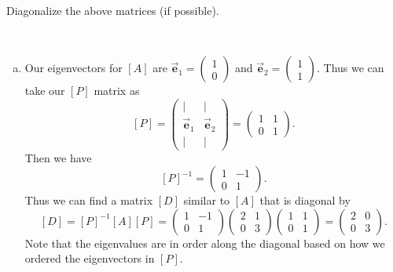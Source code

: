 \documentclass[12pt]{article} %
\newcommand{\evec}{\vec{\boldsymbol{e}}}
\begin{document}
\newpage
\begin{problem}
Diagonalize the above matrices (if possible).
\end{problem}
\begin{solution}~
\begin{enumerate}[(a)]
    \item Our eigenvectors for $[A]$ are $\evec_1 = \begin{pmatrix} 1 \\ 0 \end{pmatrix}$ and $\evec_2 = \begin{pmatrix} 1 \\ 1\end{pmatrix}$. Thus we can take our $[P]$ matrix as
    \[
    [P] = \begin{pmatrix} \vert & \vert \\ \evec_1 & \evec_2 \\ \vert & \vert\end{pmatrix} = \begin{pmatrix} 1 & 1 \\ 0 & 1 \end{pmatrix}.
    \]
    Then we have
    \[
    [P]^{-1} = \begin{pmatrix} 1 & -1 \\ 0 & 1 \end{pmatrix}.
    \]
    Thus we can find a matrix $[D]$ similar to $[A]$ that is diagonal by
    \[
    [D] = [P]^{-1} [A] [P] = \begin{pmatrix} 1 & -1 \\ 0 & 1 \end{pmatrix} \begin{pmatrix} 2 & 1 \\ 0 & 3 \end{pmatrix} \begin{pmatrix} 1 & 1 \\ 0 & 1 \end{pmatrix} = \begin{pmatrix} 2 & 0 \\ 0 & 3 \end{pmatrix}.
    \]
    Note that the eigenvalues are in order along the diagonal based on how we ordered the eigenvectors in $[P]$.


\end{enumerate}
\end{solution}
\end{document}
